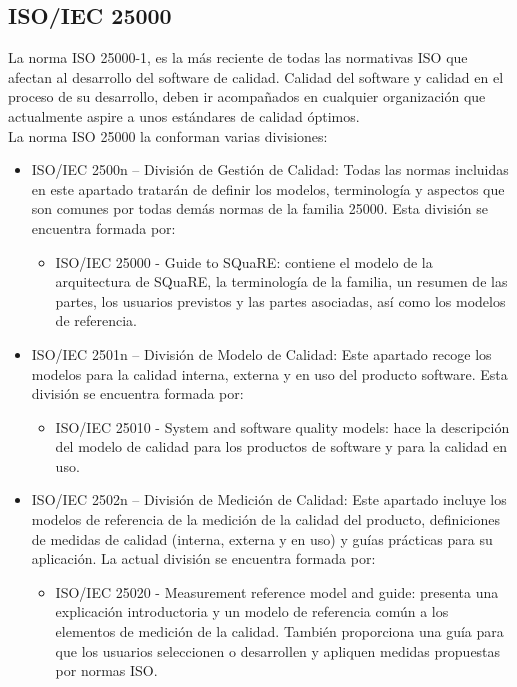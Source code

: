\documentclass[preprint,12pt]{elsarticle}
\begin{document}
	\subsection{\textbf{ISO/IEC 25000}}
	La norma ISO 25000-1, es la más reciente de todas las normativas ISO que afectan al desarrollo del software de calidad. Calidad del software y calidad en el proceso de su desarrollo, deben ir acompañados en cualquier organización que actualmente aspire a unos estándares de calidad óptimos.
\\
La norma ISO 25000 la conforman varias divisiones: 
	\begin{itemize}
		\item ISO/IEC 2500n – División de Gestión de Calidad:
		Todas las normas incluidas en este apartado tratarán de definir los modelos, terminología y aspectos que son comunes por todas demás normas de la familia 25000. Esta división se encuentra formada por:
		\begin{itemize}
			\item ISO/IEC 25000 - Guide to SQuaRE: contiene el modelo de la arquitectura de SQuaRE, la terminología de la familia, un resumen de las partes, los usuarios previstos y las partes asociadas, así como los modelos de referencia.
		\end{itemize}
		
		\item ISO/IEC 2501n – División de Modelo de Calidad:
		Este apartado recoge los modelos para la calidad interna, externa y en uso del producto software. Esta división se encuentra formada por:
		\begin{itemize}
			\item ISO/IEC 25010 - System and software quality models: hace la descripción del modelo de calidad para los productos de software y para la calidad en uso.
		\end{itemize}
		
		\item ISO/IEC 2502n – División de Medición de Calidad: Este apartado incluye los modelos de referencia de la medición de la calidad del producto, definiciones de medidas de calidad (interna, externa y en uso) y guías prácticas para su aplicación. La actual división se encuentra formada por:
		\begin{itemize}
			\item ISO/IEC 25020 - Measurement reference model and guide: presenta una explicación introductoria y un modelo de referencia común a los elementos de medición de la calidad. También proporciona una guía para que los usuarios seleccionen o desarrollen y apliquen medidas propuestas por normas ISO.
		\end{itemize}
		

\end{itemize}
\end{document}

